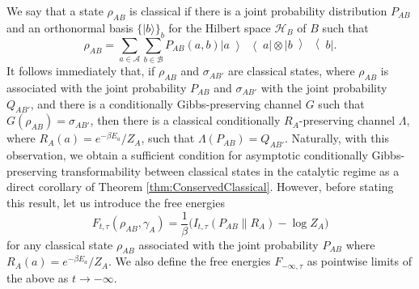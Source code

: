 \documentclass[aps,pra,11pt,onecolumn,nofootinbib,tightenlines]{revtex4-2}
\theoremstyle{definition}
\newcommand{\mc}[1]{\mathcal{#1}}
\newcommand{\ketbra}[2]{\left|#1\middle\rangle\middle\langle #2\right|}
\begin{document}
We say that a state $\rho_{AB}$ is classical if there is a joint probability distribution $P_{AB}$ and an orthonormal basis $\{|b\rangle\}_b$ for the Hilbert space $\mc H_B$ of $B$ such that
\begin{equation}
\rho_{AB}=\sum_{a\in\mc A}\sum_{b\in\mc B}P_{AB}(a,b)\ketbra{a}{a}\otimes\ketbra{b}{b}.
\end{equation}
It follows immediately that, if $\rho_{AB}$ and $\sigma_{AB'}$ are classical states, where $\rho_{AB}$ is associated with the joint probability $P_{AB}$ and $\sigma_{AB'}$ with the joint probability $Q_{AB'}$, and there is a conditionally Gibbs-preserving channel $G$ such that $G(\rho_{AB})=\sigma_{AB'}$, then there is a classical conditionally $R_A$-preserving channel $\Lambda$, where $R_A(a)=e^{-\beta E_a}/Z_A$, such that $\Lambda(P_{AB})=Q_{AB'}$. Naturally, with this observation, we obtain a sufficient condition for asymptotic conditionally Gibbs-preserving transformability between classical states in the catalytic regime as a direct corollary of Theorem \ref{thm:ConservedClassical}. However, before stating this result, let us introduce the free energies
\begin{equation}
F_{t,\tau}(\rho_{AB},\gamma_A)=\frac{1}{\beta}\big(I_{t,\tau}(P_{AB}\|R_A)-\log{Z_A}\big)
\end{equation}
for any classical state $\rho_{AB}$ associated with the joint probability $P_{AB}$ where $R_A(a)=e^{-\beta E_a}/Z_A$. We also define the free energies $F_{-\infty,\tau}$ as pointwise limits of the above as $t\to-\infty$.
\end{document}
